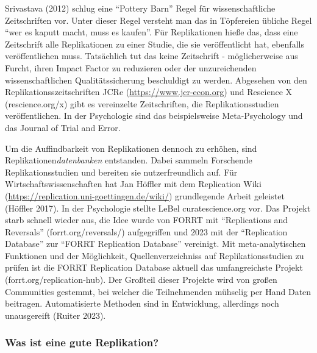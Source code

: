 \documentclass[
  letterpaper,
  DIV=11,
  numbers=noendperiod]{scrreprt}
\begin{document}
Srivastava (2012) schlug eine ``Pottery Barn'' Regel für
wissenschaftliche Zeitschriften vor. Unter dieser Regel versteht man das
in Töpfereien übliche Regel ``wer es kaputt macht, muss es kaufen''. Für
Replikationen hieße das, dass eine Zeitschrift alle Replikationen zu
einer Studie, die sie veröffentlicht hat, ebenfalls veröffentlichen
muss. Tatsächlich tut das keine Zeitschrift - möglicherweise aus Furcht,
ihren Impact Factor zu reduzieren oder der unzureichenden
wissenschaftlichen Qualitätssicherung beschuldigt zu werden. Abgesehen
von den Replikationsszeitschriften JCRe (\url{https://www.jcr-econ.org})
und Rescience X (rescience.org/x) gibt es vereinzelte Zeitschriften, die
Replikationsstudien veröffentlichen. In der Psychologie sind das
beispielsweise Meta-Psychology und das Journal of Trial and Error.

Um die Auffindbarkeit von Replikationen dennoch zu erhöhen, sind
Replikationen\emph{datenbanken} entstanden. Dabei sammeln Forschende
Replikationsstudien und bereiten sie nutzerfreundlich auf. Für
Wirtschaftswissenschaften hat Jan Höffler mit dem Replication Wiki
(\href{https://replication.uni-goettingen.de/wiki/index.php/Special:FormEdit/New_Replication}{https://replication.uni-goettingen.de/wiki/})
grundlegende Arbeit geleistet (Höffler 2017). In der Psychologie stellte
LeBel curatescience.org vor. Das Projekt starb schnell wieder aus, die
Idee wurde von FORRT mit ``Replications and Reversals''
(forrt.org/reversals/) aufgegriffen und 2023 mit der ``Replication
Database'' zur ``FORRT Replication Database'' vereinigt. Mit
meta-analytischen Funktionen und der Möglichkeit, Quellenverzeichniss
auf Replikationsstudien zu prüfen ist die FORRT Replication Database
aktuell das umfangreichste Projekt (forrt.org/replication-hub). Der
Großteil dieser Projekte wird von großen Communities gestemmt, bei
welcher die Teilnehmenden mühselig per Hand Daten beitragen.
Automatisierte Methoden sind in Entwicklung, allerdings noch
unausgereift (Ruiter 2023).

\subsubsection{Was ist eine gute
Replikation?}\label{was-ist-eine-gute-replikation}
\end{document}
